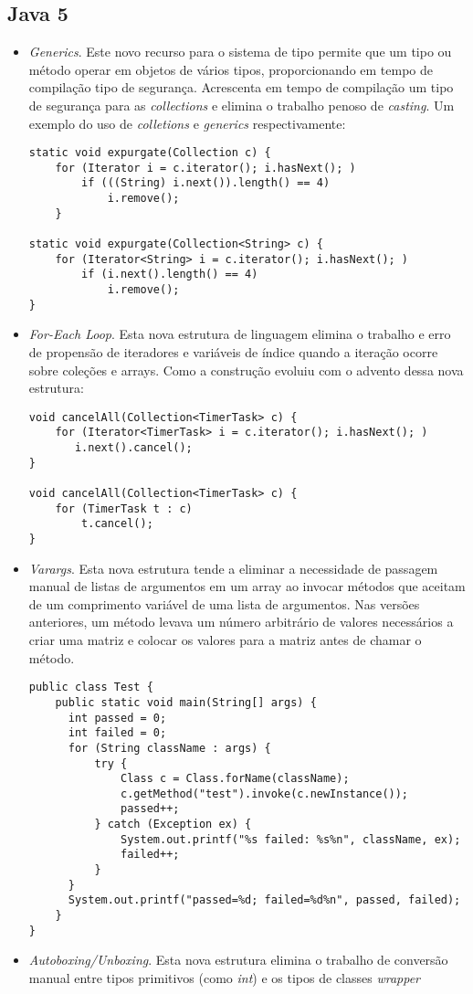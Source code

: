 	\subsection {Java 5}
	  \begin{itemize}
		  \item {\it Generics}. Este novo recurso para o sistema de tipo permite que um tipo ou método operar em objetos de vários tipos, proporcionando em tempo de compilação tipo de segurança. Acrescenta em tempo de compilação um tipo de segurança para as {\it collections} e elimina o trabalho penoso de {\it casting}. Um exemplo do uso de {\it colletions} e {\it generics} respectivamente:
\begin{lstlisting}
static void expurgate(Collection c) {
	for (Iterator i = c.iterator(); i.hasNext(); )
		if (((String) i.next()).length() == 4)
			i.remove();
	}
	
static void expurgate(Collection<String> c) {
	for (Iterator<String> i = c.iterator(); i.hasNext(); )
		if (i.next().length() == 4)
			i.remove();
}
\end{lstlisting}
		  
		\item {\it For-Each Loop}. Esta nova estrutura de linguagem elimina o trabalho e erro de propensão de iteradores e variáveis de índice quando a iteração ocorre sobre coleções e arrays. Como a construção evoluiu com o advento dessa nova estrutura:
	
\begin{lstlisting}
void cancelAll(Collection<TimerTask> c) {
	for (Iterator<TimerTask> i = c.iterator(); i.hasNext(); )
	   i.next().cancel();
}
	
void cancelAll(Collection<TimerTask> c) {
	for (TimerTask t : c)
		t.cancel();
}
\end{lstlisting}
	  
	  \clearpage
	  \item {\it Varargs}. Esta nova estrutura tende a eliminar a necessidade de passagem manual de listas de argumentos em um array ao invocar métodos que aceitam de um comprimento variável de uma lista de argumentos. Nas versões anteriores, um método levava um número arbitrário de valores necessários a  criar uma matriz e colocar os valores para a matriz antes de chamar o método.


\begin{lstlisting}
public class Test {
	public static void main(String[] args) {
	  int passed = 0;
	  int failed = 0;
	  for (String className : args) {
	      try {
	          Class c = Class.forName(className);
	          c.getMethod("test").invoke(c.newInstance());
	          passed++;
	      } catch (Exception ex) {
	          System.out.printf("%s failed: %s%n", className, ex);
	          failed++;
	      }
	  }
	  System.out.printf("passed=%d; failed=%d%n", passed, failed);
	}
}
\end{lstlisting}
 
	  \item {\it Autoboxing/Unboxing}. Esta nova estrutura elimina o trabalho de conversão manual entre tipos primitivos (como {\it int}) e os tipos de classes {\it wrapper}
  \end{itemize}
  
